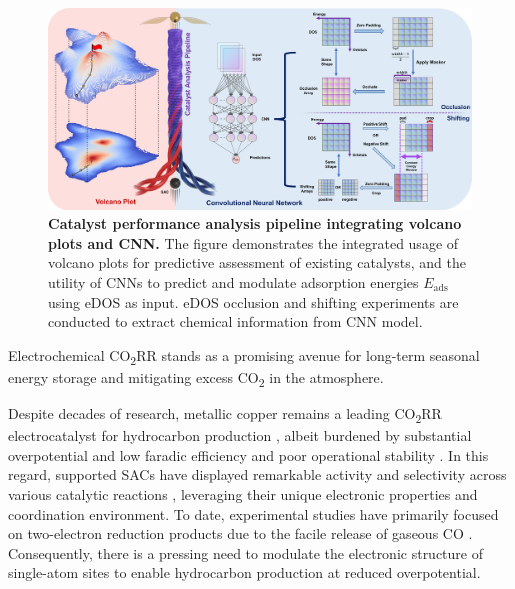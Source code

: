 \documentclass[a4paper, 12pt, titlepage]{article}
\begin{document}
    \begin{figure}[htbp]
        \centering
        \includegraphics[width=\textwidth]{main_fig1_pipeline.png}
        \caption{\textbf{Catalyst performance analysis pipeline integrating volcano plots and CNN.}
        The figure demonstrates the integrated usage of volcano plots for
        predictive assessment of existing catalysts, and the utility of CNNs
        to predict and modulate adsorption energies \(E_{\text{ads}}\) using eDOS as input.
        eDOS occlusion and shifting experiments are conducted to extract chemical information from CNN model.}
        \label{main_fig1:pipeline}
    \end{figure}

    Electrochemical CO\textsubscript{2}RR stands as a promising avenue for long-term
    seasonal energy storage \cite{dinh2018co2} and mitigating excess CO\textsubscript{2} in the atmosphere.

    Despite decades of research, metallic copper remains a leading CO\textsubscript{2}RR electrocatalyst
    for hydrocarbon production \cite{osella2023co2}, albeit burdened by substantial overpotential
    and low faradic efficiency and poor operational stability \cite{chen2019identifying, liu2021co2}.
    In this regard, supported SACs have displayed remarkable activity and selectivity
    across various catalytic reactions \cite{wang2018heterogeneous, yang2018atomically},
    leveraging their unique electronic properties and coordination environment.
    To date, experimental studies have primarily focused on two-electron reduction products
    due to the facile release of gaseous CO \cite{cai2021insights, ju2017understanding, ren2019isolated}.
    Consequently, there is a pressing need to modulate the electronic structure of single-atom sites
    to enable hydrocarbon production at reduced overpotential.
\end{document}
